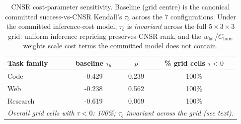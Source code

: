 \begin{table}[t]
\centering
\caption{CNSR cost-parameter sensitivity. Baseline (grid centre) is the canonical committed success-vs-CNSR Kendall's $\tau_b$ across the 7 configurations. Under the committed inference-cost model, $\tau_b$ is \emph{invariant} across the full $5\times3\times3$ grid: uniform inference repricing preserves CNSR rank, and the $w_{\mathrm{lat}}$/$C_{\mathrm{hum}}$ weights scale cost terms the committed model does not contain.}
\label{tab:cnsr_sensitivity}
\begin{tabular}{lccc}
\toprule
Task family & baseline $\tau_b$ & $p$ & \% grid cells $\tau<0$ \\
\midrule
Code & -0.429 & 0.239 & 100\% \\
Web & -0.238 & 0.562 & 100\% \\
Research & -0.619 & 0.069 & 100\% \\
\midrule
\multicolumn{4}{l}{\textit{Overall grid cells with $\tau<0$: 100\%; $\tau_b$ invariant across the grid (see text).}} \\
\bottomrule
\end{tabular}
\end{table}

